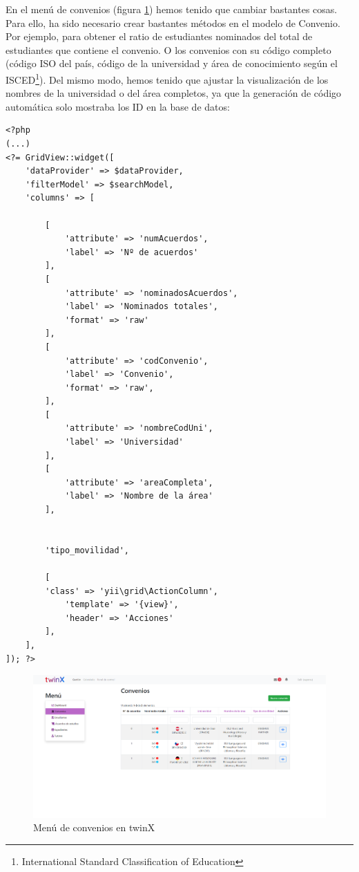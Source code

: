 En el menú de convenios (figura \ref{fig:menuconveniotwinX}) hemos tenido que cambiar bastantes cosas. Para ello, ha sido necesario crear bastantes métodos en el modelo de Convenio. Por ejemplo, para obtener el ratio de estudiantes nominados del total de estudiantes que contiene el convenio. O los convenios con su código completo (código ISO del país, código de la universidad y área de conocimiento según el ISCED\footnote{International Standard Classification of Education}). Del mismo modo, hemos tenido que ajustar la visualización de los nombres de la universidad o del área completos, ya que la generación de código automática solo mostraba los ID en la base de datos:

\begin{verbatim}
<?php
(...)
<?= GridView::widget([
	'dataProvider' => $dataProvider,
	'filterModel' => $searchModel,
	'columns' => [
	
		[
			'attribute' => 'numAcuerdos',
			'label' => 'Nº de acuerdos'
		],
		[
			'attribute' => 'nominadosAcuerdos',
			'label' => 'Nominados totales',
			'format' => 'raw'
		],
		[
			'attribute' => 'codConvenio',
			'label' => 'Convenio',
			'format' => 'raw',
		],
		[
			'attribute' => 'nombreCodUni',
			'label' => 'Universidad'
		],
		[
			'attribute' => 'areaCompleta',
			'label' => 'Nombre de la área'
		],
	
	
		'tipo_movilidad',
	
		[
		'class' => 'yii\grid\ActionColumn',
			'template' => '{view}',
			'header' => 'Acciones'
		],
	],
]); ?>
\end{verbatim}

\begin{figure}
	\centering
	\includegraphics[width=\linewidth]{Capturas de twinX/menu_convenio}
	\caption{Menú de convenios en twinX}
	\label{fig:menuconveniotwinX}
\end{figure}

